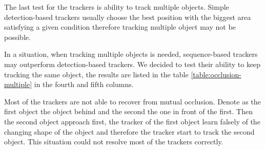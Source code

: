 The last test for the trackers is ability to track multiple objects. Simple
detection-based trackers usually choose the best position with the biggest area
satisfying a given condition therefore tracking multiple object may not be possible.

In a situation, when tracking multiple objects is needed, sequence-based
trackers may outperform detection-based trackers. We decided to test their
ability to keep tracking the same object, the results are listed in the table
\ref{table:occlusion-multiple} in the fourth and fifth columns.

Most of the trackers are not able to recover from mutual occlusion. Denote as
the first object the object behind and the second the one in front of the
first. Then the second object approach first, the tracker of the first object
learn falsely of the changing shape of the object and therefore the tracker start
to track the second object. This situation could not resolve most of the
trackers correctly.

